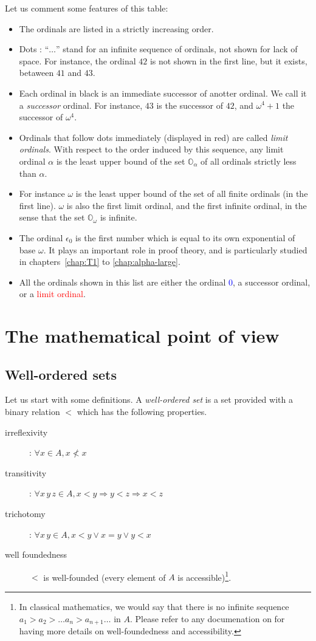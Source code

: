 Let us comment some features of this table:

\begin{itemize}
\item The ordinals are listed in a strictly increasing order. 
\item Dots : ``$\ldots$'' stand for an infinite sequence of ordinals, not shown for lack of space. For instance, the ordinal $42$ is not shown in the first line, but it exists, betaween $41$ and $43$.
\item Each ordinal in black is an immediate successor of anotter ordinal. We call it a \emph{successor} ordinal. For instance, $43$ is the successor of $42$, and $\omega^4+1$ the successor of $\omega^4$.
\item Ordinals that  follow dots immediately (displayed in red) are called \emph{limit ordinals}. With respect to the order induced by this sequence, any limit ordinal $\alpha$ is the least upper bound of  the set $\mathbb{O}_\alpha$ of all ordinals strictly less than $\alpha$.
\item
For instance $\omega$ is the least upper bound of the set of all finite ordinals (in the first line). $\omega$ is also the first limit ordinal, and the first infinite ordinal, in the sense that 
the set $\mathbb{O}_\omega$ is infinite.
\item The ordinal $\epsilon_0$ is the first number which is equal to its own exponential of base $\omega$. It plays an important role in proof theory, and is particularly studied in chapters~\ref{chap:T1} to \ref{chap:alpha-large}.
\item All the ordinals shown in this list are either the ordinal \textcolor{blue}{$0$},
a successor ordinal, or a \textcolor{red}{limit ordinal}.
\end{itemize}




\section{The mathematical point of view}

\subsection{Well-ordered sets}
Let us start with some definitions.
A  \emph{well-ordered set} is a set provided with a binary relation $<$ which has the following properties.
\begin{description}
\item[irreflexivity] : $\forall x\in A, x\not< x$
\item[transitivity] : $\forall x\,y\,z\in A, x<y \Rightarrow y<z \Rightarrow x<z$
\item[trichotomy]: $\forall x\,y\in A, x<y \vee x = y \vee y < x$
\item[well foundedness] $<$ is well-founded (every element of $A$ is accessible)\footnote{In classical mathematics, we would say that there is no infinite sequence $a_1>a_2> \dots a_n> a_{n+1}\dots$ in $A$. Please refer to any documenation on \coq{} for having more details on well-foundedness and accessibility.}.

\end{description}

